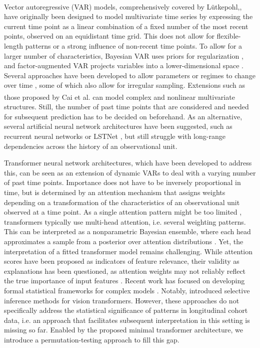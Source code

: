 \documentclass[AMA,Times1COL]{WileyNJDv5} %
\begin{document}
Vector autoregressive (VAR) models, comprehensively covered by L\"utkepohl,\textsuperscript{\cite{lutkepohl_new_2005}}, have originally been designed to model multivariate time series by expressing the current time point as a linear combination of a fixed number of the most recent points, observed on an equidistant time grid. This does not allow for flexible-length patterns or a strong influence of non-recent time points. To allow for a larger number of characteristics, Bayesian VAR uses priors for regularization \citep{litterman_forecasting_1986}, and factor-augmented VAR projects variables into a lower-dimensional space \citep{bernanke_measuring_2005}. Several approaches have been developed to allow parameters or regimes to change over time \citep{tong_threshold_1991, krolzig_markov-switching_1997, tsay_testing_1998}, some of which also allow for irregular sampling. Extensions such as those proposed by Cai et al.\textsuperscript{\cite{cai_functional-coefficient_2000}} can model complex and nonlinear multivariate structures. Still, the number of past time points that are considered and needed for subsequent prediction has to be decided on beforehand. As an alternative, several artificial neural network architectures have been suggested, such as recurrent neural networks \citep{lipton_critical_2015} or LSTNet \citep{lai_modeling_2018},  but still struggle  with long-range dependencies across the history of an observational unit.  

Transformer neural network architectures, which have been developed to address this,  can be seen as an extension of dynamic VARs \citep{lu_linear_2025} to deal with a varying number of past time points. Importance does not have to be inversely proportional in time, but is determined by an attention mechanism that assigns weights depending on a transformation of the characteristics of an observational unit observed at a time point. As a single attention pattern might be too limited \cite{cui_superiority_2025}, transformers typically use multi-head attention, i.e. several weighting patterns. This can be interpreted as a nonparametric Bayesian ensemble, where each head approximates a sample from a posterior over attention distributions \citep{an_repulsive_2020}.  Yet, the interpretation of a fitted transformer model remains challenging. While attention scores have been proposed as indicators of feature relevance, their validity as explanations has been questioned, as attention weights may not reliably reflect the true importance of input features \citep{jain_attention_2019}. Recent work has focused on developing formal statistical frameworks for complex models \citep{coleman_scalable_2022, miwa_statistical_2024}. Notably, \cite{shiraishi_statistical_2025} introduced selective inference methods for vision transformers. However, these approaches do not specifically address the statistical significance of patterns in longitudinal cohort data, i.e. an approach that facilitates subsequent interpretation in this setting is missing so far. Enabled by the proposed minimal transformer architecture, we introduce a permutation-testing approach to fill this gap.
\end{document}
